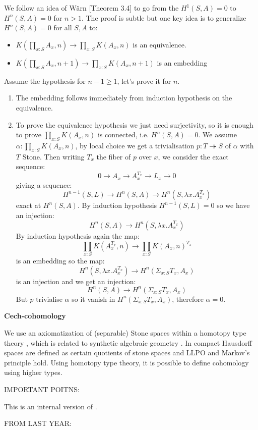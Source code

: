 \documentclass{../util/zariski}
\begin{document}
We follow an idea of Wärn \cite{cech-draft}[Theorem 3.4] to go from the $H^1(S,A)=0$ to $H^n(S,A)=0$ for $n>1$. The proof is subtle but one key idea is to generalize $H^n(S,A) = 0$ for all $S,A$ to: 
\begin{itemize}
\item $K(\prod_{x:S}A_x,n) \to \prod_{x:S}K(A_x,n)$ is an equivalence.
\item $K(\prod_{x:S}A_x,n+1) \to \prod_{x:S}K(A_x,n+1)$ is an embedding
\end{itemize}
Assume the hypothesis for $n-1\geq 1$, let's prove it for $n$.
\begin{enumerate}
\item The embedding follows immediately from induction hypothesis on the equivalence.
\item To prove the equivalence hypothesis we just need surjectivity, so it is enough to prove $\prod_{x:S}K(A_x,n)$ is connected, i.e. $H^n(S,A)=0$. We assume $\alpha:\prod_{x:S}K(A_x,n)$, by local choice we get a trivialisation $p:T\twoheadrightarrow S$ of $\alpha$ with $T$ Stone. Then writing $T_x$ the fiber of $p$ over $x$, we consider the exact sequence:
\[0\to A_x\to A_x^{T_x}\to L_x\to 0\]
giving a sequence:
\[H^{n-1}(S,L)\to H^n(S,A)\to H^n(S,\lambda x. A_x^{T_x})\]
exact at $H^n(S,A)$. By induction hypothesis $H^{n-1}(S,L) = 0$ so we have an injection:
\[H^n(S,A)\to H^n(S,\lambda x. A_x^{T_x})\]
By induction hypothesis again the map: 
\[\prod_{x:S}K(A_x^{T_x},n)\to \prod_{x:S}K(A_x,n)^{T_x}\]
is an embedding so the map:
\[H^n(S,\lambda x. A_x^{T_x}) \to H^n(\Sigma_{x:S}T_x,A_x)\]
is an injection and we get an injection:
\[H^n(S,A)\to H^n(\Sigma_{x:S}T_x,A_x)\] 
But $p$ trivialise $\alpha$ so it vanish in $H^n(\Sigma_{x:S}T_x,A_x)$, therefore $\alpha=0$.
\end{enumerate}

\textbf{Cech-cohomology}


We use an axiomatization of (separable) Stone spaces within a homotopy type theory \cite{synthetic-stone-duality}, which is related to synthetic algebraic geometry \cite{draft}.
In \cite{synthetic-stone-duality} compact Hausdorff spaces are defined as certain quotients of stone spaces and LLPO and Markov's principle hold.
Using homotopy type theory, it is possible to define cohomology using higher types.

IMPORTANT POITNS:

This is an internal version of \cite{dyckhoff76}.

FROM LAST YEAR:
\end{document}
